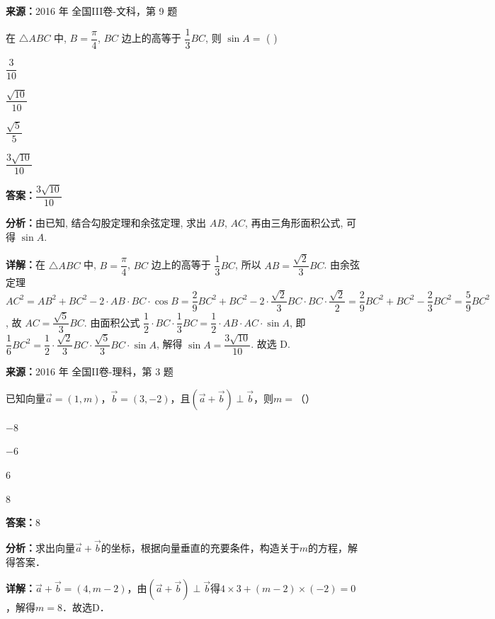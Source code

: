 \begin{question}[points=5]
\textbf{来源：}2016 年 全国III卷-文科，第 9 题\par
在 $\triangle ABC$ 中, $B=\dfrac{\pi}{4}$, $BC$ 边上的高等于 $\dfrac{1}{3}BC$, 则 $\sin A=$ ( )
\begin{choices}
  \item $\dfrac{3}{10}$
  \item $\dfrac{\sqrt{10}}{10}$
  \item $\dfrac{\sqrt{5}}{5}$
  \item $\dfrac{3\sqrt{10}}{10}$
\end{choices}
\begin{solution}
\textbf{答案：}$\dfrac{3\sqrt{10}}{10}$

\textbf{分析：}由已知, 结合勾股定理和余弦定理, 求出 $AB$, $AC$, 再由三角形面积公式, 可得 $\sin A$.

\textbf{详解：}在 $\triangle ABC$ 中, $B=\dfrac{\pi}{4}$, $BC$ 边上的高等于 $\dfrac{1}{3}BC$, 所以 $AB=\dfrac{\sqrt{2}}{3}BC$. 由余弦定理 $AC^2=AB^2+BC^2-2\cdot AB\cdot BC\cdot\cos B=\dfrac{2}{9}BC^2+BC^2-2\cdot\dfrac{\sqrt{2}}{3}BC\cdot BC\cdot\dfrac{\sqrt{2}}{2}=\dfrac{2}{9}BC^2+BC^2-\dfrac{2}{3}BC^2=\dfrac{5}{9}BC^2$, 故 $AC=\dfrac{\sqrt{5}}{3}BC$. 由面积公式 $\dfrac{1}{2}\cdot BC\cdot\dfrac{1}{3}BC=\dfrac{1}{2}\cdot AB\cdot AC\cdot\sin A$, 即 $\dfrac{1}{6}BC^2=\dfrac{1}{2}\cdot\dfrac{\sqrt{2}}{3}BC\cdot\dfrac{\sqrt{5}}{3}BC\cdot\sin A$, 解得 $\sin A=\dfrac{3\sqrt{10}}{10}$. 故选 D.
\end{solution}
\end{question}

\begin{question}[points=5]
\textbf{来源：}2016 年 全国II卷-理科，第 3 题\par
已知向量$\overrightarrow{a}=(1,m)$，$\overrightarrow{b}=(3,-2)$，且$(\overrightarrow{a}+\overrightarrow{b})\perp\overrightarrow{b}$，则$m=$（\quad）
\begin{choices}
  \item $-8$
  \item $-6$
  \item $6$
  \item $8$
\end{choices}
\begin{solution}
\textbf{答案：}$8$

\textbf{分析：}求出向量$\overrightarrow{a}+\overrightarrow{b}$的坐标，根据向量垂直的充要条件，构造关于$m$的方程，解得答案．

\textbf{详解：}$\overrightarrow{a}+\overrightarrow{b}=(4,m-2)$，由$(\overrightarrow{a}+\overrightarrow{b})\perp\overrightarrow{b}$得$4\times3+(m-2)\times(-2)=0$，解得$m=8$．故选D．
\end{solution}
\end{question}


